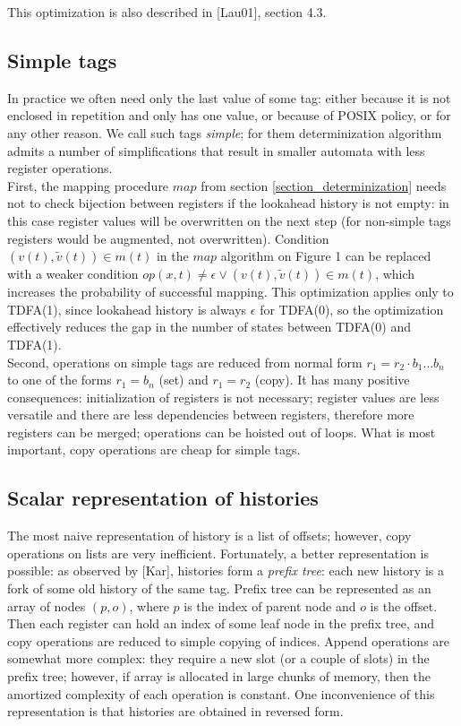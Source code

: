 \documentclass{article}
\newcommand{\Xin}{\!\in\!}
\newcommand{\Xeq}{\!=\!}
\theoremstyle{definition}
\begin{document}
\begin{multicols}{2}
This optimization is also described in [Lau01], section 4.3.

\subsection*{Simple tags}

In practice we often need only the last value of some tag:
either because it is not enclosed in repetition and only has one value, or because of POSIX policy, or for any other reason.
We call such tags \emph{simple};
for them determinization algorithm admits a number of simplifications
that result in smaller automata with less register operations.
\\

First, the mapping procedure $map$ from section \ref{section_determinization}
needs not to check bijection between registers if the lookahead history is not empty:
in this case register values will be overwritten on the next step
(for non-simple tags registers would be augmented, not overwritten).
Condition $(v(t), \widetilde{v}(t)) \Xin m(t)$ in the $map$ algorithm on Figure 1
can be replaced with a weaker condition $op(x, t) \!\neq\! \epsilon \vee (v(t), \widetilde{v}(t)) \Xin m(t)$,
which increases the probability of successful mapping.
This optimization applies only to TDFA(1), since lookahead history is always $\epsilon$ for TDFA(0),
so the optimization effectively reduces the gap in the number of states between TDFA(0) and TDFA(1).
\\

Second, operations on simple tags are reduced from normal form $r_1 \Xeq r_2 \cdot b_1 \dots b_n$
to one of the forms $r_1 \Xeq b_n$ (set) and $r_1 \Xeq r_2$ (copy).
It has many positive consequences:
initialization of registers is not necessary;
register values are less versatile and there are less dependencies between registers, therefore more registers can be merged;
operations can be hoisted out of loops.
What is most important, copy operations are cheap for simple tags.

\subsection*{Scalar representation of histories}

The most naive representation of history is a list of offsets;
however, copy operations on lists are very inefficient.
Fortunately, a better representation is possible: as observed by [Kar], histories form a \emph{prefix tree}:
each new history is a fork of some old history of the same tag.
Prefix tree can be represented as an array of nodes $(p, o)$,
where $p$ is the index of parent node and $o$ is the offset.
Then each register can hold an index of some leaf node in the prefix tree,
and copy operations are reduced to simple copying of indices.
Append operations are somewhat more complex: they require a new slot (or a couple of slots) in the prefix tree;
however, if array is allocated in large chunks of memory,
then the amortized complexity of each operation is constant.
One inconvenience of this representation is that histories are obtained in reversed form.


\end{multicols}
\end{document}
